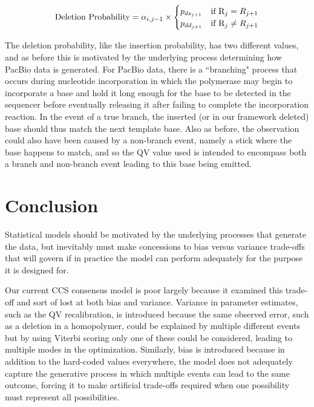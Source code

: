 \documentclass[fleqn,10pt]{SelfArx} %
\begin{document}
\begin{dmath}
	\text{Deletion Probability} = \alpha_{i,j-1}  \\
	\times  \begin{cases}
				p_{ds_{j+1}}  & \text{if }  \text{R}_{j} = R_{j+1} \\
				p_{dd_{j+1}} & \text{if }  \text{R}_{j} \neq R_{j+1} 
				\end{cases}
\end{dmath}



The deletion probability, like the insertion probability, has two different values, and as before this is motivated by the underlying process determining how PacBio data is generated.  For PacBio data, there is a ``branching" process that occurs during nucleotide incorporation in which the polymerase may begin to incorporate a base and hold it long enough for the base to be detected in the sequencer before eventually releasing it after failing to complete the incorporation reaction.  In the event of a true branch, the inserted (or in our framework deleted) base should thus match the next template base.  Also as before, the observation could also have been caused by a non-branch event, namely a stick where the base happens to match, and so the QV value used is intended to encompass both a branch and non-branch event leading to this base being emitted.





\section{Conclusion}

Statistical models should be motivated by the underlying processes that generate the data, but inevitably must make concessions to bias versus variance trade-offs that will govern if in practice the model can perform adequately for the purpose it is designed for.

Our current CCS consensus model is poor largely because it examined this trade-off and sort of lost at both bias and variance.  Variance in parameter estimates, such as the QV recalibration, is introduced because the same observed error, such as a deletion in a homopolymer, could be explained by multiple different events but by using Viterbi scoring only one of these could be considered, leading to multiple modes in the optimization.  Similarly, bias is introduced because in addition to the hard-coded values everywhere, the model does not adequately capture the generative process in which multiple events can lead to the same outcome, forcing it to make artificial trade-offs required when one possibility must represent all possibilities.
\end{document}
